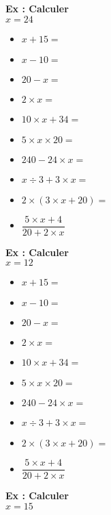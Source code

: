 



\begin{multicols}{3}
  
\textbf{Ex : Calculer} \\

$x = 24$ 

\begin{itemize}[label={$\bullet$}]
  \item $x + 15 = $ \dotfill
  \item $x - 10 = $ \dotfill
  \item $20 - x = $ \dotfill
  \item $2 \times x = $ \dotfill
  \item $10 \times x + 34 = $ \dotfill
  \item $5 \times  x \times 20 = $ \dotfill
  \item $240 - 24 \times x = $ \dotfill
  \item $x \div 3 + 3 \times x = $ \dotfill
  \item $2 \times (3  \times x + 20) = $ \dotfill
  \item $\dfrac{5 \times x + 4}{20 + 2 \times x}$ \dotfill
\end{itemize} \columnbreak

\textbf{Ex : Calculer} \\

$x = 12$ 

\begin{itemize}[label={$\bullet$}]
  \item $x + 15 = $ \dotfill
  \item $x - 10 = $ \dotfill
  \item $20 - x = $ \dotfill
  \item $2 \times x = $ \dotfill
  \item $10 \times x + 34 = $ \dotfill
  \item $5 \times  x \times 20 = $ \dotfill
  \item $240 - 24 \times x = $ \dotfill
  \item $x \div 3 + 3 \times x = $ \dotfill
  \item $2 \times (3  \times x + 20) = $ \dotfill
  \item $\dfrac{5 \times x + 4}{20 + 2 \times x}$ \dotfill
\end{itemize} \columnbreak

\textbf{Ex : Calculer} \\

$x = 15$ 


\end{multicols}
